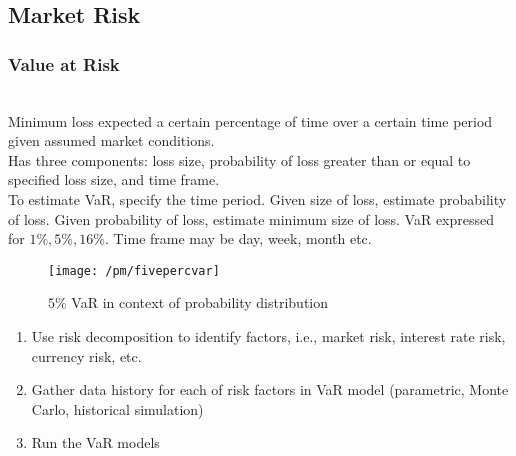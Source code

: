 \subsection{Market Risk}

\subsubsection{Value at Risk}

\begin{definition} \\
Minimum loss expected a certain percentage of time over a certain time period given assumed market conditions.\\
Has three components: loss size, probability of loss greater than or equal to specified loss size, and time frame.\\
To estimate VaR, specify the time period. Given size of loss, estimate probability of loss. Given probability of loss, estimate minimum size of loss. VaR expressed for $1\%, 5\%, 16\%$. Time frame may be day, week, month etc.
\end{definition}

\begin{figure}[H]
\centering
\texttt{[image: /pm/fivepercvar]}
\caption{$5\%$ VaR in context of probability distribution}
\end{figure}

\begin{method} 
\begin{enumerate}[label=\roman*.]
\setlength{\itemsep}{0pt}
\item Use risk decomposition to identify factors, i.e., market risk, interest rate risk, currency risk, etc.
\item Gather data history for each of risk factors in VaR model (parametric, Monte Carlo, historical simulation)
\item Run the VaR models
\end{enumerate}
\end{method}

